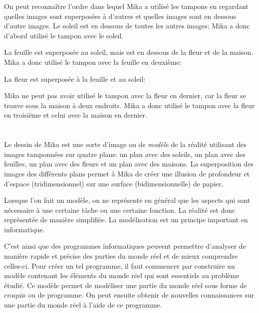 {{On peut reconnaître l’ordre dans lequel Mika a utilisé les tampons en regardant quelles images sont superposées à d’autres et quelles images sont en dessous d’autre images. Le soleil est en dessous de toutes les autres images: Mika a donc d’abord utilisé le tampon avec le soleil.

{\centering%
\par}

La feuille est superposée au soleil, mais est en dessous de la fleur et de la maison. Mika a donc utilisé le tampon avec la feuille en deuxième:

{\centering%
\par}

La fleur est superposée à la feuille et au soleil:

{\centering%
\par}

Mika ne peut pas avoir utilisé le tampon avec la fleur en dernier, car la fleur se trouve sous la maison à deux endroits. Mika a donc utilisé le tampon avec la fleur en troisième et celui avec la maison en dernier.

{\centering%
\par}



\section*{\BrochureItsInformatics}
Le dessin de Mika est une sorte d’image ou de \emph{modèle} de la réalité utilisant des images tamponnées sur quatre plans: un plan avec des soleils, un plan avec des feuilles, un plan avec des fleurs et un plan avec des maisons. La superposition des images des différents plans permet à Mika de créer une illusion de profondeur et d’espace (tridimensionnel) sur une surface (bidimensionnelle) de papier.

Lorsque l’on fait un modèle, on ne représente en général que les aspects qui sont nécessaire à une certaine tâche ou une certaine fonction. La réalité est donc représentée de manière simplifiée. La modélisation est un principe important en informatique.

C’est ainsi que des programmes informatiques peuvent permettre d’analyser de manière rapide et précise des parties du monde réel et de mieux comprendre celles-ci. Pour créer un tel programme, il faut commencer par construire un modèle contenant les éléments du monde réel qui sont essentiels au problème étudié. Ce modèle permet de modéliser une partie du monde réel sous forme de croquis ou de programme. On peut ensuite obtenir de nouvelles connaissances sur une partie du monde réel à l’aide de ce programme.



}}
